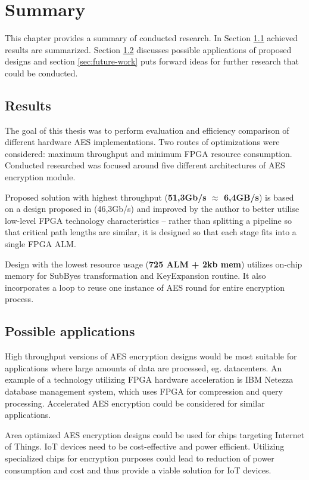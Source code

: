 \section{Summary}
This chapter provides a summary of conducted research. In Section \ref{sec:results} achieved results are summarized. Section \ref{sec:possible-applications} discusses possible applications of proposed designs and section \ref{sec:future-work} puts forward ideas for further research that could be conducted.


\subsection{Results}
\label{sec:results}
The goal of this thesis was to perform evaluation and efficiency comparison of different hardware AES implementations. Two routes of optimizations were considered: maximum throughput and minimum FPGA resource consumption. Conducted researched was focused around five different architectures of AES encryption module.

Proposed solution with highest throughput (\textbf{51,3Gb/s $\approx$ 6,4GB/s}) is based on a design proposed in \cite{vlsi} (46,3Gb/s) and improved by the author to better utilise low-level FPGA technology characteristics -- rather than splitting a pipeline so that critical path lengths are similar, it is designed so that each stage fits into a single FPGA ALM.

Design with the lowest resource usage (\textbf{725 ALM + 2kb mem}) utilizes on-chip memory for SubByes transformation and KeyExpansion routine. It also incorporates a loop to reuse one instance of AES round for entire encryption process.

\subsection{Possible applications}
\label{sec:possible-applications}
High throughput versions of AES encryption designs would be most suitable for applications where large amounts of data are processed, eg. datacenters. An example of a technology utilizing FPGA hardware acceleration is IBM Netezza \cite{netezzafast, francisco2011netezza} database management system, which uses FPGA for compression and query processing. Accelerated AES encryption could be considered for similar applications.

Area optimized AES encryption designs could be used for chips targeting Internet of Things. IoT devices need to be cost-effective and power efficient. Utilizing specialized chips for encryption purposes could lead to reduction of power consumption and cost and thus provide a viable solution for IoT devices.

